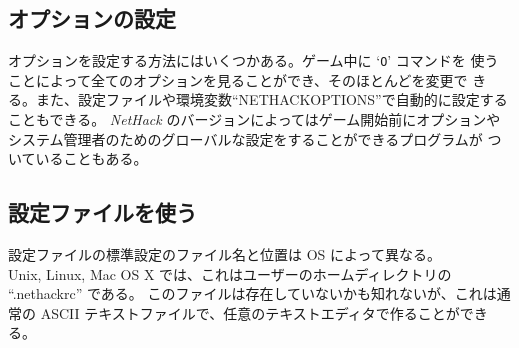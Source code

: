 \subsection*{オプションの設定}

オプションを設定する方法にはいくつかある。ゲーム中に `{\tt O}' コマンドを
使うことによって全てのオプションを見ることができ、そのほとんどを変更で
きる。また、設定ファイルや環境変数``NETHACKOPTIONS''で自動的に設定する
こともできる。
{\it NetHack\/} のバージョンによってはゲーム開始前にオプションや
システム管理者のためのグローバルな設定をすることができるプログラムが
ついていることもある。

\subsection*{設定ファイルを使う}

設定ファイルの標準設定のファイル名と位置は OS によって異なる。\\

Unix, Linux, Mac OS X では、これはユーザーのホームディレクトリの
\mbox{``.nethackrc''} である。
このファイルは存在していないかも知れないが、これは通常の
ASCII テキストファイルで、任意のテキストエディタで作ることができる。\\


